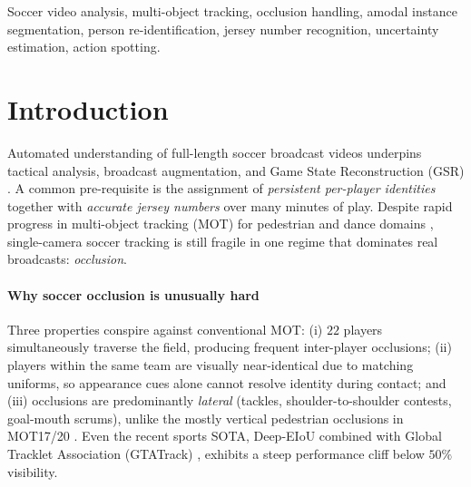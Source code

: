 \documentclass[conference]{IEEEtran}
\begin{document}
\begin{IEEEkeywords}
Soccer video analysis, multi-object tracking, occlusion handling, amodal instance segmentation, person re-identification, jersey number recognition, uncertainty estimation, action spotting.
\end{IEEEkeywords}

\section{Introduction}
\label{sec:intro}

Automated understanding of full-length soccer broadcast videos underpins tactical analysis, broadcast augmentation, and Game State Reconstruction (GSR) \cite{somers2024gsr, gsr2025winner}. A common pre-requisite is the assignment of \emph{persistent per-player identities} together with \emph{accurate jersey numbers} over many minutes of play. Despite rapid progress in multi-object tracking (MOT) for pedestrian and dance domains \cite{bytetrack, ocsort, strongsort, deepocsort}, single-camera soccer tracking is still fragile in one regime that dominates real broadcasts: \emph{occlusion}.

\paragraph*{Why soccer occlusion is unusually hard}
Three properties conspire against conventional MOT: (i) $22$ players simultaneously traverse the field, producing frequent inter-player occlusions; (ii) players within the same team are visually near-identical due to matching uniforms, so appearance cues alone cannot resolve identity during contact; and (iii) occlusions are predominantly \emph{lateral} (tackles, shoulder-to-shoulder contests, goal-mouth scrums), unlike the mostly vertical pedestrian occlusions in MOT17/20 \cite{mot20}. Even the recent sports SOTA, Deep-EIoU combined with Global Tracklet Association (GTATrack) \cite{deepeiou, gtatrack}, exhibits a steep performance cliff below $50\%$ visibility.
\end{document}

